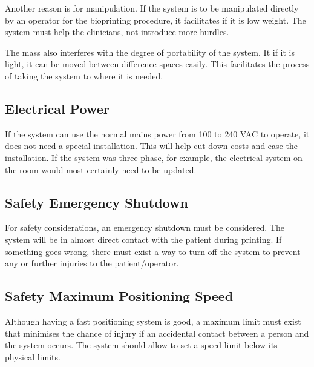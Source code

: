 Another reason is for manipulation. If the system is to be manipulated directly by an operator for the bioprinting procedure, it facilitates if it is low weight. The system must help the clinicians, not introduce more hurdles.

The mass also interferes with the degree of portability of the system. It if it is light, it can be moved between difference spaces easily. This facilitates the process of taking the system to where it is needed.


\subsection{Electrical Power}
\label{subsec:system_architecture_requirements_physical_power}

If the system can use the normal mains power from 100 to 240 VAC to operate, it does not need a special installation. This will help cut down costs and ease the installation. If the system was three-phase, for example, the electrical system on the room would most certainly need to be updated.


\subsection{Safety Emergency Shutdown}
\label{subsec:system_architecture_requirements_safety_emergency_shutdown}

For safety considerations, an emergency shutdown must be considered. The system will be in almost direct contact with the patient during printing. If something goes wrong, there must exist a way to turn off the system to prevent any or further injuries to the patient/operator.


\subsection{Safety Maximum Positioning Speed}
\label{subsec:system_architecture_requirements_safety_max_positioning_speed}

Although having a fast positioning system is good, a maximum limit must exist that minimises the chance of injury if an accidental contact between a person and the system occurs. The system should allow to set a speed limit below its physical limits.

